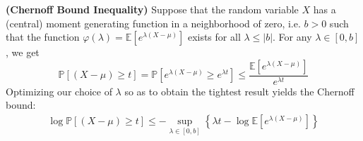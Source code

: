 \documentclass{article}
\newcommand{\bfs}[1]{\textbf{({#1})}}
\begin{document}
\begin{thma}{\bfs{Chernoff Bound Inequality}}\label{basic:thm3}
Suppose that the random variable $X$ has a  (central) moment generating function in a neighborhood of zero, i.e. $b>0$ such that the function $\varphi(\lambda)=\mathbb{E}\left[e^{\lambda(X-\mu)}\right]$ exists for all $\lambda \leq|b|$. For any $\lambda \in[0, b]$, we get
$$
\mathbb{P}[(X-\mu) \geq t]=\mathbb{P}\left[e^{\lambda(X-\mu)} \geq e^{\lambda t}\right] \leq \frac{\mathbb{E}\left[e^{\lambda(X-\mu)}\right]}{e^{\lambda t}}
$$
Optimizing our choice of $\lambda$ so as to obtain the tightest result yields the Chernoff bound:
\begin{align}
\log \mathbb{P}[(X-\mu) \geq t] \leq -\sup_{\lambda \in[0, b]}\left\{\lambda t - \log \mathbb{E}\left[e^{\lambda(X-\mu)}\right]\right\}\label{basic:eq2}
\end{align}
\end{thma}
\end{document}
